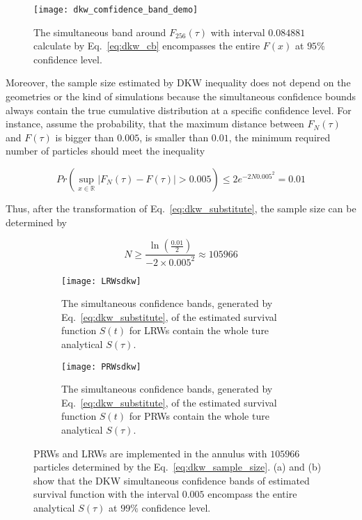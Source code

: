 \begin{figure}
  \centering
  \texttt{[image: dkw\_comfidence\_band\_demo]}
  \caption{The simultaneous band around $F_{256}(\tau)$ with interval
    $0.084881$ calculate by Eq.~\ref{eq:dkw_cb} encompasses
    the entire $F(x)$ at $95\%$ confidence level. \label{fig:dkw_cb_sample}}
\end{figure}



Moreover, the sample size estimated by DKW inequality  does
not depend on the geometries or the kind of simulations because the
simultaneous confidence bounds always contain the true cumulative
distribution at a specific confidence level. For instance, assume the
probability, that the maximum distance between $F_N(\tau)$ and
$F(\tau)$ is bigger than $0.005$, is smaller than $0.01$, the minimum
required number of particles should meet the inequality

\begin{equation}\label{eq:dkw_substitute}
  Pr(\sup_{x \in \mathbb{R}} |F_{N}(\tau) - F(\tau)| > 0.005) \leq 2e^{-2N0.005^2} = 0.01
\end{equation}

Thus, after the transformation of Eq.~\ref{eq:dkw_substitute}, the
sample size can be determined by

\begin{equation}\label{eq:dkw_sample_size}
  N \geq \frac{\ln(\frac{0.01}{2})}{-2 \times 0.005^2} \approx
  105966
\end{equation}


\begin{figure}
  \begin{subfigure}{0.9\textwidth}
    \centering
    \texttt{[image: LRWsdkw]}
    \caption{The simultaneous confidence bands, generated by
      Eq.~\ref{eq:dkw_substitute}, of the estimated survival function
      $S(t)$ for LRWs contain the whole ture analytical
      $S(\tau)$. \label{fig:dkw_lrws_analytical}}
  \end{subfigure}
  \begin{subfigure}{0.9\textwidth}
    \centering
    \texttt{[image: PRWsdkw]}
    \caption{The simultaneous confidence bands, generated by
      Eq.~\ref{eq:dkw_substitute}, of the estimated survival function
      $S(t)$ for PRWs contain the whole ture analytical
      $S(\tau)$. \label{fig:dkw_prws_analytical}}
  \end{subfigure}
  \caption{PRWs and LRWs are implemented in the annulus with $105966$
    particles determined by the Eq.~\ref{eq:dkw_sample_size}. (a) and
    (b) show that the DKW simultaneous confidence bands of estimated
    survival function with the interval $0.005$ encompass the entire
    analytical $S(\tau)$ at $99 \%$ confidence level. \label{fig:dkw_rw_analytical}}
\end{figure}

